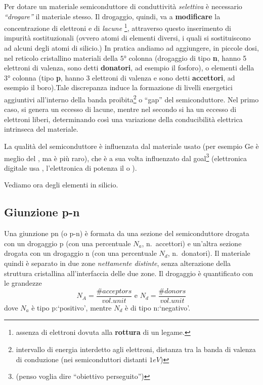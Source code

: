 \documentclass[
]{book}
\begin{document}
Per dotare un materiale semiconduttore di conduttività \emph{selettiva}
è necessario \emph{``drogare''} il materiale stesso. Il drogaggio,
quindi, va a \textbf{modificare} la concentrazione di elettroni e di
\emph{lacune} \footnote{assenza di elettroni dovuta alla
  \textbf{rottura} di un legame.}, attraverso questo inserimento di
impurità sostituzionali (ovvero atomi di elementi diversi, i quali si
sostituiscono ad alcuni degli atomi di silicio.) \newline In pratica
andiamo ad aggiungere, in piccole dosi, nel reticolo cristallino
materiali della \(5°\) colonna (drogaggio di tipo \textbf{n}, hanno 5
elettroni di valenza, sono detti \textbf{donatori}, ad esempio il
fosforo), o elementi della \(3°\) colonna (tipo \textbf{p}, hanno 3
elettroni di valenza e sono detti \textbf{accettori}, ad esempio il
boro).\newline Tale discrepanza induce la formazione di livelli
energetici aggiuntivi all'interno della banda proibita\footnote{intervallo
  di energia interdetto agli elettroni, distanza tra la banda di valenza
  di conduzione (nei semiconduttori distanti \(1\si{eV}\))} o ``gap''
del semiconduttore. Nel primo caso, si genera un eccesso di lacune,
mentre nel secondo si ha un eccesso di elettroni liberi, determinando
così una variazione della conducibilità elettrica intrinseca del
materiale.

La qualità del semiconduttore è influenzata dal materiale usato (per
esempio Ge è meglio del , ma è più raro), che è a sua volta
influenzato dal goal\footnote{(penso voglia dire ``obiettivo
  perseguito'')} (elettronica digitale usa , l'elettronica di
potenza il  o ).

Vediamo ora degli elementi in silicio.

\subsection{Giunzione p-n}\label{giunzione-p-n}

Una giunzione pn (o p-n) è formata da una sezione del semiconduttore
drogata con un drogaggio p (con una percentuale \(N_{a}\), n.~accettori)
e un'altra sezione drogata con un drogaggio n (con una percentuale
\(N_{d}\), n.~donatori). \newline Il materiale quindi è separato in due
zone \emph{nettamente distinte}, senza alterazione della struttura
cristallina all'interfaccia delle due zone. \newline Il drogaggio è
quantificato con le grandezze \[
N_A = \frac{\# acceptors}{vol. unit} \text{ e } N_d=\frac{\# donors}{vol. unit}
\] dove \(N_a\) è tipo p:`positivo', mentre \(N_d\) è di tipo
n:`negativo'.
\end{document}
